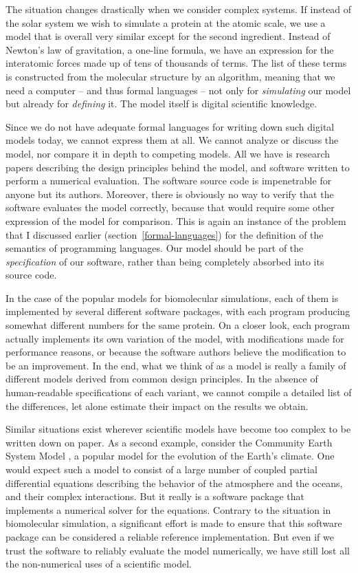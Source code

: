 The situation changes drastically when we consider complex systems. If instead of the solar system we wish to simulate a protein at the atomic scale, we use a model that is overall very similar except for the second ingredient. Instead of Newton's law of gravitation, a one-line formula, we have an expression for the interatomic forces made up of tens of thousands of terms. The list of these terms is constructed from the molecular structure by an algorithm, meaning that we need a computer -- and thus formal languages -- not only for \textit{simulating} our model but already for \textit{defining} it. The model itself is digital scientific knowledge.

Since we do not have adequate formal languages for writing down such digital models today, we cannot express them at all. We cannot analyze or discuss the model, nor compare it in depth to competing models. All we have is research papers describing the design principles behind the model, and software written to perform a numerical evaluation. The software source code is impenetrable for anyone but its authors. Moreover, there is obviously no way to verify that the software evaluates the model correctly, because that would require some other expression of the model for comparison. This is again an instance of the problem that I discussed earlier (section~\ref{formal-languages}) for the definition of the semantics of programming languages. Our model should be part of the \textit{specification} of our software, rather than being completely absorbed into its source code.

In the case of the popular models for biomolecular simulations, each of them is implemented by several different software packages, with each program producing somewhat different numbers for the same protein. On a closer look, each program actually implements its own variation of the model, with modifications made for performance reasons, or because the software authors believe the modification to be an improvement. In the end, what we think of as a model is really a family of different models derived from common design principles. In the absence of human-readable specifications of each variant, we cannot compile a detailed list of the differences, let alone estimate their impact on the results we obtain.

Similar situations exist wherever scientific models have become too complex to be written down on paper. As a second example, consider the Community Earth System Model \cite{_community_1983}, a popular model for the evolution of the Earth's climate. One would expect such a model to consist of a large number of coupled partial differential equations describing the behavior of the atmosphere and the oceans, and their complex interactions. But it really is a software package that implements a numerical solver for the equations. Contrary to the situation in biomolecular simulation, a significant effort is made to ensure that this software package can be considered a reliable reference implementation. But even if we trust the software to reliably evaluate the model numerically, we have still lost all the non-numerical uses of a scientific model.

